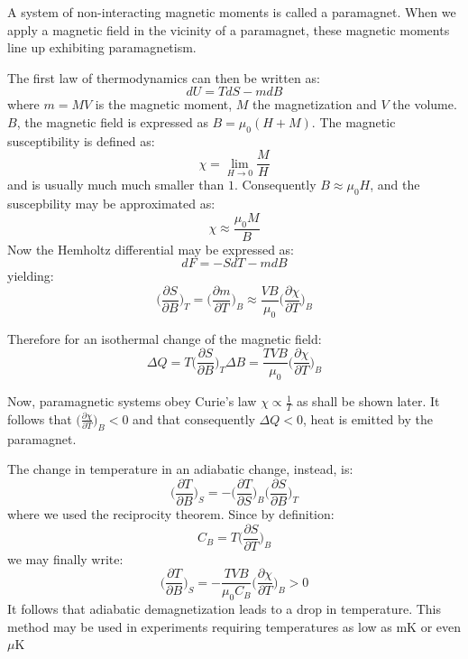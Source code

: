 \documentclass[a4paper,11pt,oneside]{book}
\begin{document}
A system of non-interacting magnetic moments is called a paramagnet. When we apply a magnetic field in the vicinity of a paramagnet, these magnetic moments line up exhibiting paramagnetism. 

The first law of thermodynamics can then be written as:
\begin{equation}
    dU = T dS - m dB
\end{equation}
where $m=MV$ is the magnetic moment, $M$ the magnetization and $V$ the volume. $B$, the magnetic field is expressed as $B = \mu_0(H+M)$. The magnetic susceptibility is defined as:
\begin{equation}
    \chi = \lim_{H \rightarrow 0} \frac{M}{H}
\end{equation}
and is usually much much smaller than $1$. Consequently $B \approx \mu_0 H$, and the suscepbility may be approximated as:
\begin{equation}
    \chi \approx \frac{\mu_0 M}{B}
\end{equation}
Now the Hemholtz differential may be expressed as:
\begin{equation}
    dF = - SdT - mdB
\end{equation}
yielding:
\begin{equation}
     \bigg(\frac{\partial S}{\partial B}\bigg)_T =  \bigg(\frac{\partial m}{\partial T}\bigg)_B \approx \frac{VB}{\mu_0} \bigg(\frac{\partial \chi}{\partial T}\bigg)_B
\end{equation}

Therefore for an isothermal change of the magnetic field:
\begin{equation}
    \Delta Q = T  \bigg(\frac{\partial S}{\partial B}\bigg)_T \Delta B = \frac{TVB}{\mu_0}\bigg(\frac{\partial \chi}{\partial T}\bigg)_B
\end{equation}

Now, paramagnetic systems obey Curie's law $\chi \propto \frac{1}{T}$ as shall be shown later. It follows that $\bigg(\frac{\partial \chi}{\partial T}\bigg)_B<0$ and that consequently $\Delta Q <0$, heat is emitted by the paramagnet. 

The change in temperature in an adiabatic change, instead, is:
\begin{equation}
    \bigg(\frac{\partial T}{\partial B}\bigg)_S = - \bigg(\frac{\partial T}{\partial S}\bigg)_B\bigg(\frac{\partial S}{\partial B}\bigg)_T
\end{equation}
where we used the reciprocity theorem. Since by definition:
\begin{equation}
    C_B = T \bigg(\frac{\partial S}{\partial T}\bigg)_B
\end{equation}
we may finally write:
\begin{equation}
     \bigg(\frac{\partial T}{\partial B}\bigg)_S  = -\frac{TVB}{\mu_0 C_B} \bigg(\frac{\partial \chi}{\partial T}\bigg)_B>0
\end{equation}
It follows that adiabatic demagnetization leads to a drop in temperature. This method may be used in experiments requiring temperatures as low as mK or even $\mu$K
\end{document}
